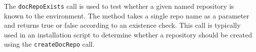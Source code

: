 The \verb+docRepoExists+ call is used to test whether a given named repository is known
to the \Rapture environment. The method takes a single repo name as a parameter and returns
true or false according to an existence check. This call is typically used in an installation
script to determine whether a repository should be created using the \verb+createDocRepo+ call.
